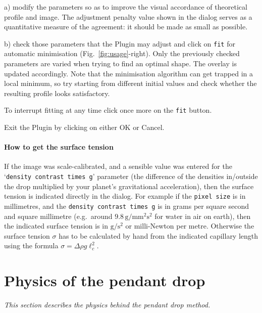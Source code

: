 \documentclass[fleqn]{scrartcl}
\begin{document}
a) modify the parameters so as to improve the visual accordance of
theoretical profile and image. The adjustment penalty value shown in
the dialog serves as a quantitative measure of the agreement: it
should be made as small as possible.

b) check those parameters that the Plugin may adjust and click on
\texttt{fit} for automatic minimisation (Fig.~\ref{fig:usage}-right).
Only the previously checked parameters are varied when trying to find
an optimal shape. The overlay is updated accordingly. Note that the
minimisation algorithm can get trapped in a local minimum, so try
starting from different initial values and check whether the resulting
profile looks satisfactory.

To interrupt fitting at any time click once more on the \texttt{fit}
button.

Exit the Plugin by clicking on either OK or Cancel.

\paragraph{How to get the surface tension}
If the image was scale-calibrated, and a sensible value was entered
for the `\texttt{density contrast times g}' parameter (the difference
of the densities in/outside the drop multiplied by your planet's
gravitational acceleration), then the surface tension is indicated
directly in the dialog. For example if the \texttt{pixel size} is in
millimetres, and the \texttt{density contrast times g} is in grams per
square second and square millimetre (e.g.\ around
$9.8\,\mathrm{g}/\mathrm{mm}^2\mathrm{s}^2$ for water in air on
earth), then the indicated surface tension is in
$\mathrm{g}/\mathrm{s}^2$ or milli-Newton per metre. Otherwise the
surface tension $\sigma$ has to be calculated by hand from the
indicated capillary length using the formula $\sigma = \Delta\!\rho g
\ell_c^2$.


\section{Physics of the pendant drop}
\label{sec:theory}

\textit{\small This section describes the physics behind the pendant drop method.\medskip}
\end{document}

